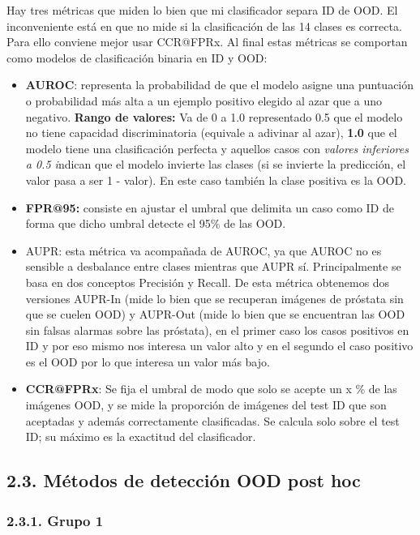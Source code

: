 Hay tres métricas que miden lo bien que mi clasificador separa ID de
OOD. El inconveniente está en que no mide si la clasificación de las 14
clases es correcta. Para ello conviene mejor usar CCR@FPRx. Al final
estas métricas se comportan como modelos de clasificación binaria en ID
y OOD:

\begin{itemize}
\item
  \textbf{AUROC}: representa la probabilidad de que el modelo asigne una
  puntuación o probabilidad más alta a un ejemplo positivo elegido al
  azar que a uno negativo. \textbf{Rango de valores:} Va de 0 a 1.0
  representado 0.5 que el modelo no tiene capacidad discriminatoria
  (equivale a adivinar al azar), \textbf{1.0} que el modelo tiene una
  clasificación perfecta y aquellos casos con \emph{valores inferiores a
  0.5 i}ndican que el modelo invierte las clases (si se invierte la
  predicción, el valor pasa a ser 1 - valor). En este caso también la
  clase positiva es la OOD.
\item
  \textbf{FPR@95:} consiste en ajustar el umbral que delimita un caso
  como ID de forma que dicho umbral detecte el 95\% de las OOD.
\item
  AUPR: esta métrica va acompañada de AUROC, ya que AUROC no es sensible
  a desbalance entre clases mientras que AUPR sí. Principalmente se basa
  en dos conceptos Precisión y Recall. De esta métrica obtenemos dos
  versiones AUPR-In (mide lo bien que se recuperan imágenes de próstata
  sin que se cuelen OOD) y AUPR-Out (mide lo bien que se encuentran las
  OOD sin falsas alarmas sobre las próstata), en el primer caso los
  casos positivos en ID y por eso mismo nos interesa un valor alto y en
  el segundo el caso positivo es el OOD por lo que interesa un valor más
  bajo.
\item
  \textbf{CCR@FPRx}: Se fija el umbral de modo que solo se acepte un x
  \% de las imágenes OOD, y se mide la proporción de imágenes del test
  ID que son aceptadas y además correctamente clasificadas. Se calcula
  solo sobre el test ID; su máximo es la exactitud del clasificador.
\end{itemize}

\subsection{2.3. Métodos de detección OOD post
hoc}\label{muxe9todos-de-detecciuxf3n-ood-post-hoc}

\subsubsection{2.3.1. Grupo 1}\label{grupo-1}

